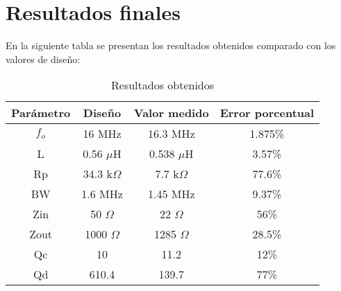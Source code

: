 \section{Resultados finales}

En la siguiente tabla se presentan los resultados obtenidos comparado con los valores de diseño: 
\begin{table}[H]
\centering
\begin{tabular}{|c|c|c|c|}
\hline
\rowcolor[HTML]{C0C0C0}
\textbf{Parámetro} & \textbf{Diseño} & \textbf{Valor medido} & \textbf{Error porcentual} \\ \hline
$f_o$ & 16 MHz & 16.3 MHz & 1.875\% \\ \hline
L & 0.56 $\mu$H & 0.538 $\mu$H & 3.57\% \\ \hline
Rp & 34.3 k$\Omega$ & 7.7 k$\Omega$ & 77.6\% \\ \hline
BW & 1.6 MHz & 1.45 MHz & 9.37\% \\ \hline
Zin & 50 $\Omega$ & 22 $\Omega$ & 56\% \\ \hline
Zout & 1000 $\Omega$ & 1285 $\Omega$ & 28.5\% \\ \hline
Qc & 10 & 11.2 & 12\% \\ \hline
Qd & 610.4 & 139.7 & 77\% \\ \hline
\end{tabular}
\caption{Resultados obtenidos}
\label{tab:resultados}
\end{table}




